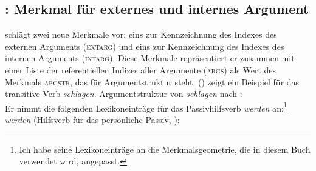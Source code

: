 {%
%
%



\subsection{\citet{Ryu97a}: Merkmal für externes und internes Argument}
\label{sec-ryu-passive}

\mbox{}\citet{Ryu97a} schlägt zwei neue Merkmale vor: eins zur Kennzeichnung des Indexes des
externen Arguments (\textsc{extarg}) und eins zur Kennzeichnung des Indexes des internen
Arguments (\textsc{intarg}). Diese Merkmale repräsentiert er zusammen mit einer Liste
der referentiellen Indizes aller Argumente (\textsc{args})
als Wert des Merkmals \textsc{argstr}, das für Argumentstruktur steht.
() zeigt ein Beispiel für das transitive Verb \emph{schlagen}.
\ea
Argumentstruktur von \emph{schlagen} nach :\\
\z
Er nimmt die folgenden Lexikoneinträge für das Passivhilfsverb \emph{werden} an:\footnote{
  Ich habe seine Lexikoneinträge an die Merkmalsgeometrie, die in diesem Buch verwendet wird,
  angepasst.%
}
\eas
\emph{werden} (Hilfsverb für das persönliche Passiv, \citealt[]{Ryu97a}):\\
\zs

}
